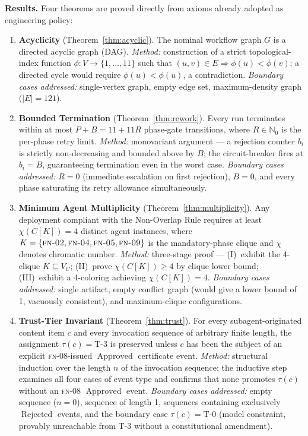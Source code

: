 \documentclass[12pt]{article}
\theoremstyle{definition}
\newcommand{\FN}[1]{\textsc{fn-#1}}
\DeclareMathOperator{\Approved}{Approved}
\DeclareMathOperator{\Rejected}{Rejected}
\begin{document}
\medskip
\noindent
\textbf{Results.}
Four theorems are proved directly from axioms already adopted as
engineering policy:
\begin{enumerate}
    \item[(R1)] \textbf{Acyclicity} (Theorem~\ref{thm:acyclic}).
          The nominal workflow graph $G$ is a directed acyclic graph
          (DAG).
          \emph{Method:} construction of a strict topological-index
          function $\phi : V \to \{1,\ldots,11\}$ such that
          $(u,v)\in E \Rightarrow \phi(u) < \phi(v)$; a directed
          cycle would require $\phi(u) < \phi(u)$, a contradiction.
          \emph{Boundary cases addressed:} single-vertex graph,
          empty edge set, maximum-density graph ($|E| = 121$).
    \item[(R2)] \textbf{Bounded Termination} (Theorem~\ref{thm:rework}).
          Every run terminates within at most $P + B = 11 + 11R$
          phase-gate transitions, where $R \in \mathbb{N}_0$ is the
          per-phase retry limit.
          \emph{Method:} monovariant argument --- a rejection counter
          $b_i$ is strictly non-decreasing and bounded above by $B$;
          the circuit-breaker fires at $b_i = B$, guaranteeing
          termination even in the worst case.
          \emph{Boundary cases addressed:} $R=0$ (immediate
          escalation on first rejection), $B=0$, and every phase
          saturating its retry allowance simultaneously.
    \item[(R3)] \textbf{Minimum Agent Multiplicity}
          (Theorem~\ref{thm:multiplicity}).
          Any deployment compliant with the Non-Overlap Rule requires
          at least $\chi(C[K]) = 4$ distinct agent instances, where
          $K = \{\FN{02}, \FN{04}, \FN{05}, \FN{09}\}$ is the
          mandatory-phase clique and $\chi$ denotes chromatic number.
          \emph{Method:} three-stage proof ---
          (I)~exhibit the 4-clique $K \subseteq V_C$;
          (II)~prove $\chi(C[K]) \geq 4$ by clique lower bound;
          (III)~exhibit a 4-coloring achieving $\chi(C[K]) = 4$.
          \emph{Boundary cases addressed:} single artifact, empty
          conflict graph (would give a lower bound of 1, vacuously
          consistent), and maximum-clique configurations.
    \item[(R4)] \textbf{Trust-Tier Invariant}
          (Theorem~\ref{thm:trust}).
          For every subagent-originated content item $c$ and every
          invocation sequence of arbitrary finite length, the
          assignment $\tau(c) = \mathrm{T\text{-}3}$ is preserved
          unless $c$ has been the subject of an explicit
          \FN{08}-issued $\Approved$ certificate event.
          \emph{Method:} structural induction over the length $n$ of
          the invocation sequence; the inductive step examines all
          four cases of event type and confirms that none promotes
          $\tau(c)$ without an \FN{08} $\Approved$ event.
          \emph{Boundary cases addressed:} empty sequence ($n=0$),
          sequence of length 1, sequences containing exclusively
          $\Rejected$ events, and the boundary case
          $\tau(c) = \mathrm{T\text{-}0}$ (model constraint,
          provably unreachable from T-3 without a constitutional
          amendment).
\end{enumerate}
\end{document}
